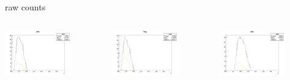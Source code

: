 \begin{frame}{raw counts}
\begin{columns}
\begin{column}[T]{0.25\textwidth}
\includegraphics[width = 0.7\textwidth]{results/yield/statistics/yield_x_Q2_z_0.45_4.750_0.40_pos.png}
\end{column}
\begin{column}[T]{0.25\textwidth}
\includegraphics[width = 0.7\textwidth]{results/yield/statistics/yield_x_Q2_z_0.45_4.750_0.40_neg.png}
\end{column}
\begin{column}[T]{0.25\textwidth}
\includegraphics[width = 0.7\textwidth]{results/yield/statistics/yield_x_Q2_z_0.45_4.750_0.50_pos.png}

\end{column}
\end{columns}
\end{frame}
